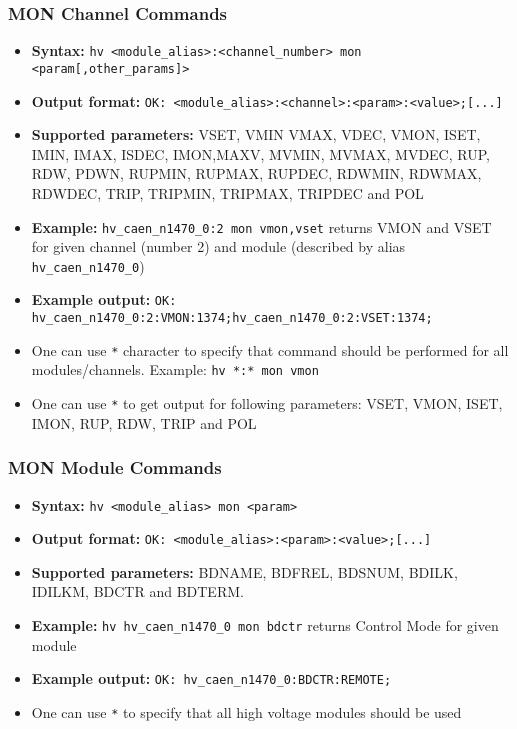 \dotfill

\subsubsection*{MON Channel Commands}
\begin{itemize}
    \item \textbf{Syntax:} \lstinline{hv <module_alias>:<channel_number> mon <param[,other_params]>}
    \item \textbf{Output format:} \lstinline{OK: <module_alias>:<channel>:<param>:<value>;[...]}
    \item \textbf{Supported parameters:} VSET, VMIN VMAX, VDEC, VMON, ISET, IMIN, IMAX, ISDEC, IMON,MAXV, MVMIN, MVMAX, MVDEC, RUP, RDW, PDWN, RUPMIN, RUPMAX, RUPDEC, RDWMIN, RDWMAX, RDWDEC, TRIP, TRIPMIN, TRIPMAX, TRIPDEC and POL
    \item \textbf{Example:} \lstinline{hv_caen_n1470_0:2 mon vmon,vset} returns VMON and VSET for given channel (number 2) and module (described by alias \lstinline{hv_caen_n1470_0})
    \item \textbf{Example output:} \lstinline{OK: hv_caen_n1470_0:2:VMON:1374;hv_caen_n1470_0:2:VSET:1374;}
    \item One can use \lstinline{*} character to specify that command should be performed for all modules/channels. Example: \lstinline{hv *:* mon vmon}
    \item One can use \lstinline{*} to get output for following parameters: VSET, VMON, ISET, IMON, RUP, RDW, TRIP and POL
\end{itemize}

\dotfill

\subsubsection*{MON Module Commands}
\begin{itemize}
    \item \textbf{Syntax:} \lstinline{hv <module_alias> mon <param>}
    \item \textbf{Output format:} \lstinline{OK: <module_alias>:<param>:<value>;[...]}
    \item \textbf{Supported parameters:} BDNAME, BDFREL, BDSNUM, BDILK, IDILKM, BDCTR and BDTERM.
    \item \textbf{Example:} \lstinline{hv hv_caen_n1470_0 mon bdctr} returns Control Mode for given module
    \item \textbf{Example output:} \lstinline{OK: hv_caen_n1470_0:BDCTR:REMOTE;}
    \item One can use \lstinline{*} to specify that all high voltage modules should be used
\end{itemize}


